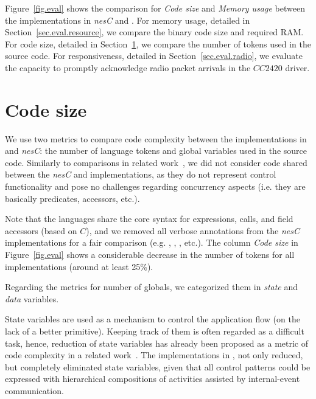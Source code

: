 Figure~\ref{fig.eval} shows the comparison for \emph{Code size} and 
\emph{Memory usage} between the implementations in \emph{nesC} and \CEU.
%
For memory usage, detailed in Section~\ref{sec.eval.resource}, we compare the 
binary code size and required RAM.
%
For code size, detailed in Section~\ref{sec.eval.code}, we compare the number 
of tokens used in the source code.
%
For responsiveness, detailed in Section~\ref{sec.eval.radio}, we evaluate the 
capacity to promptly acknowledge radio packet arrivals in the $CC2420$ driver.

\section{Code size}
\label{sec.eval.code}

We use two metrics to compare code complexity between the implementations in 
\CEU and \emph{nesC}: the number of language tokens and global variables used 
in the source code.
%
Similarly to comparisons in related work~\cite{wsn.ocram,wsn.protothreads}, we 
did not consider code shared between the \emph{nesC} and \CEU implementations, 
as they do not represent control functionality and pose no challenges regarding 
concurrency aspects (i.e. they are basically predicates,  
accessors, etc.).

%
Note that the languages share the core syntax for expressions, calls, and field 
accessors (based on $C$), and we removed all verbose annotations from the 
\emph{nesC} implementations for a fair comparison (e.g. , 
, , etc.).
%
The column \emph{Code size} in Figure~\ref{fig.eval} shows a considerable 
decrease in the number of tokens for all implementations (around at least 
25\%).

Regarding the metrics for number of globals, we categorized them in 
\emph{state} and \emph{data} variables.

State variables are used as a mechanism to control the application flow (on the 
lack of a better primitive).
Keeping track of them is often regarded as a difficult task, hence, reduction 
of state variables has already been proposed as a metric of code complexity in 
a related work~\cite{wsn.protothreads}.
The implementations in \CEU, not only reduced, but completely eliminated state 
variables, given that all control patterns could be expressed with hierarchical 
compositions of activities assisted by internal-event communication.

